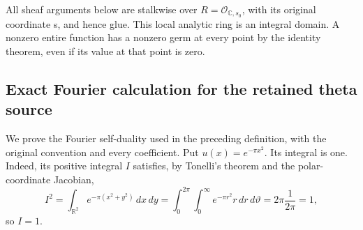 All sheaf arguments below are stalkwise over \(R=\mathcal O_{\mathbb C,s_0}\), with its original coordinate s, and hence glue. This local analytic ring is an integral domain. A nonzero entire function has a nonzero germ at every point by the identity theorem, even if its value at that point is zero.

\subsection{Exact Fourier calculation for the retained theta source}
\label{TranscriptStage:proof06:lem:typed-route-fourier-phi-star}

We prove the Fourier self-duality used in the preceding definition, with
the original convention and every coefficient. Put
\(u(x)=e^{-\pi x^2}\). Its integral is one. Indeed, its positive integral
\(I\) satisfies, by Tonelli's theorem and the polar-coordinate Jacobian,
\[
I^2=\int_{\mathbb R^2}e^{-\pi(x^2+y^2)}\,dx\,dy
 =\int_0^{2\pi}\int_0^\infty e^{-\pi r^2}r\,dr\,d\vartheta
 =2\pi\frac1{2\pi}=1,
\]
so \(I=1\).

